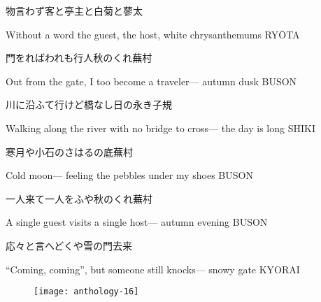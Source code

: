 \begin{haiku}
    {\FH 物言わず客と亭主と白菊と}\hfill{\FH 蓼太}

    \vin{} Without a word
    \vin{} \vin{} the guest, the host,
    \vin{} \vin{} \vin{} white chrysanthemums \hspace{\fill} RY\={O}TA
\end{haiku}

\begin{haiku}
    {\FH 門をればわれも行人秋のくれ}\hfill{\FH 蕪村}

    \vin{} Out from the gate,
    \vin{} \vin{} I too become a traveler---
    \vin{} \vin{} \vin{} autumn dusk \hspace{\fill} BUSON
\end{haiku}

\begin{haiku}
    {\FH 川に沿ふて行けど橋なし日の永き}\hfill{\FH 子規}

    \vin{} Walking along the river
    \vin{} \vin{} with no bridge to cross---
    \vin{} \vin{} \vin{} the day is long \hspace{\fill} SHIKI
\end{haiku}

\begin{haiku}
    {\FH 寒月や小石のさはるの底}\hfill{\FH 蕪村}

    \vin{} Cold moon---
    \vin{} \vin{} feeling the pebbles
    \vin{} \vin{} \vin{} under my shoes \hspace{\fill} BUSON
\end{haiku}

\begin{haiku}
    {\FH 一人来て一人をふや秋のくれ}\hfill{\FH 蕪村}

    \vin{} A single guest
    \vin{} \vin{} visits a single host---
    \vin{} \vin{} \vin{} autumn evening \hspace{\fill} BUSON
\end{haiku}

\begin{haiku}
    {\FH 応々と言へどくや雪の門}\hfill{\FH 去来}

    \vin{} ``Coming, coming'',
    \vin{} \vin{} but someone still knocks---
    \vin{} \vin{} \vin{} snowy gate \hspace{\fill} KYORAI
\end{haiku}

\begin{figure}
    \texttt{[image: anthology-16]}
\end{figure}

